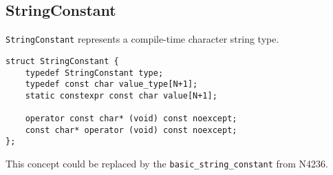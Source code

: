 \subsection{StringConstant}
\label{concept-StringConstant}

\texttt{StringConstant} represents a compile-time character string type. 

\begin{verbatim}
struct StringConstant {
	typedef StringConstant type;
	typedef const char value_type[N+1];
	static constexpr const char value[N+1];

	operator const char* (void) const noexcept;
	const char* operator (void) const noexcept;
};
\end{verbatim}

This concept could be replaced by the \texttt{basic\_string\_constant}
from N4236.
